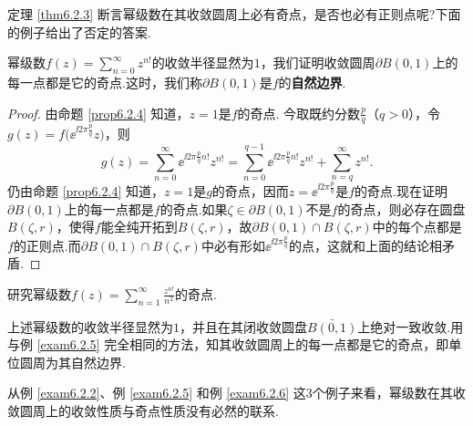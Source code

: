 定理 \ref{thm6.2.3} 断言幂级数在其收敛圆周上必有奇点，是否也必有正则点呢?下面的例子给出了否定的答案.
\begin{example}\label{exam6.2.5}
幂级数$f(z)=\sum_{n=0}^\infty z^{n!}$的收敛半径显然为$1$，我们证明收敛圆周$\partial B(0,1)$上的每一点都是它的奇点.这时，我们称$\partial B(0,1)$是$f$的\textbf{自然边界}.
\end{example}
\begin{proof}
由命题 \ref{prop6.2.4} 知道，$z=1$是$f$的奇点. 今取既约分数$\frac pq$（$q>0$），令$g(z)=f\big(\ee^{\ii2\pi\frac pq}z\big)$，则
\[g(z)=\sum_{n=0}^\infty \ee^{\ii2\pi\frac pqn!}z^{n!}
=\sum_{n=0}^{q-1}\ee^{\ii2\pi\frac pqn!}z^{n!}+\sum_{n=q}^\infty z^{n!}.\]
仍由命题 \ref{prop6.2.4} 知道，$z=1$是$g$的奇点，因而$z=\ee^{\ii2\pi\frac pq}$是$f$的奇点.现在证明$\partial B(0,1)$上的每一点都是$f$的奇点.如果$\zeta\in\partial B(0,1)$不是$f$的奇点，则必存在圆盘$B(\zeta,r)$，使得$f$能全纯开拓到$B(\zeta,r)$，故$\partial B(0,1)\cap B(\zeta,r)$中的每个点都是$f$的正则点.而$\partial B(0,1)\cap B(\zeta,r)$中必有形如$\ee^{\ii2\pi\frac pq}$的点，这就和上面的结论相矛盾.
\end{proof}

\begin{example}\label{exam6.2.6}
研究幂级数$f(z)=\sum_{n=1}^\infty\frac{z^{n!}}{n^2}$的奇点.
\end{example}
\begin{solution}
上述幂级数的收敛半径显然为$1$，并且在其闭收敛圆盘$\bar{B(0,1)}$上绝对一致收敛.用与例 \ref{exam6.2.5} 完全相同的方法，知其收敛圆周上的每一点都是它的奇点，即单位圆周为其自然边界.
\end{solution}

从例 \ref{exam6.2.2}、例 \ref{exam6.2.5} 和例 \ref{exam6.2.6} 这3个例子来看，幂级数在其收敛圆周上的收敛性质与奇点性质没有必然的联系.


